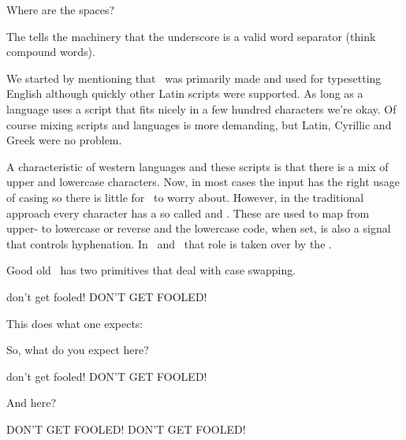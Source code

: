 \startbuffer
\nospaces\plusthree
\spacechar\underscoreasciicode
\hccode\underscoreasciicode\underscoreasciicode
Where are the spaces?
\stopbuffer

\typebuffer

The \type {\hccode} tells the machinery that the underscore is a valid word
separator (think compound words).

\start \getbuffer \stop

\stopsectionlevel

\startsectionlevel[title=Casing]

We started by mentioning that \TEX\ was primarily made and used for typesetting
English although quickly other Latin scripts were supported. As long as a
language uses a script that fits nicely in a few hundred characters we're okay.
Of course mixing scripts and languages is more demanding, but Latin, Cyrillic and
Greek were no problem.

A characteristic of western languages and these scripts is that there is a mix of
upper and lowercase characters. Now, in most cases the input has the right usage
of casing so there is little for \TEX\ to worry about. However, in the
traditional approach every character has a so called \type {\lccode} and \type
{\uccode}. These are used to map from upper- to lowercase or reverse and the
lowercase code, when set, is also a signal that controls hyphenation. In \LUATEX\
and \LUAMETATEX\ that role is taken over by the \type {\hccode}.

Good old \TEX\ has two primitives that deal with case swapping.

\startbuffer
\lowercase{Don't get fooled!}
\uppercase{Don't get fooled!}
\stopbuffer

\typebuffer[option=TEX]

This does what one expects:

\startlines
\getbuffer
\stoplines

So, what do you expect here?

\startbuffer
\edef\fooled{\lowercase{Don't get fooled!}}\meaning\fooled
\edef\fooled{\uppercase{Don't get fooled!}}\meaning\fooled
\stopbuffer

\typebuffer[option=TEX]

\startlines
\getbuffer
\stoplines

And here?

\startbuffer
\lowercase{\edef\fooled{Don't get fooled!}}\meaning\fooled
\uppercase{\edef\fooled{Don't get fooled!}}\meaning\fooled
\stopbuffer

